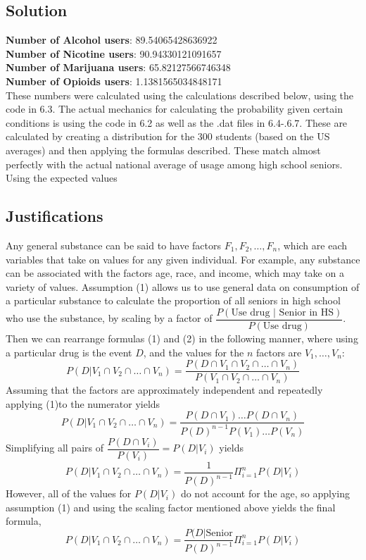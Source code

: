 \documentclass{article}
\begin{document}
    \subsection{Solution}
        \textbf{Number of Alcohol users}: 89.54065428636922\\
        \textbf{Number of Nicotine users}: 90.94330121091657\\
        \textbf{Number of Marijuana users}: 65.82127566746348\\
        \textbf{Number of Opioids users}: 1.1381565034848171\\
        These numbers were calculated using the calculations described below, using the code in 6.3. The actual mechanics for calculating the probability given certain conditions is using the code in 6.2 as well as the .dat files in 6.4-.6.7. These are calculated by creating a distribution for the 300 students (based on the US averages) and then applying the formulas described. These match almost perfectly with the actual national average of usage among high school seniors. Using the expected values 
    \subsection{Justifications}
    Any general substance can be said to have factors $F_1, F_2, \ldots, F_n$, which are each variables that take on values for any given individual. For example, any substance can be associated with the factors age, race, and income, which may take on a variety of values. Assumption (1) allows us to use general data on consumption of a particular substance to calculate the proportion of all seniors in high school who use the substance, by scaling by a factor of $\dfrac{P(\text{Use drug }|\text{ Senior in HS})}{P(\text{Use drug})}$. Then we can rearrange formulas (1) and (2) in the following manner, where using a particular drug is the event $D$, and the values for the $n$ factors are $V_1, \ldots, V_n$:
    \[
    P(D|V_1\cap V_2 \cap \ldots \cap V_n) = \dfrac{P(D\cap V_1\cap V_2 \cap \ldots \cap V_n)}{P(V_1\cap V_2 \cap \ldots \cap V_n)}
    \]
    Assuming that the factors are approximately independent and repeatedly applying (1)to the numerator yields
    \[
    P(D|V_1\cap V_2 \cap \ldots \cap V_n)=\dfrac{P(D\cap V_1)\ldots P(D\cap V_n)}{P(D)^{n-1}P(V_1)\ldots P(V_n)}
    \]
    Simplifying all pairs of $\dfrac{P(D\cap V_i)}{P(V_i)}=P(D|V_i)$ yields
    \[
    P(D|V_1\cap V_2 \cap \ldots \cap V_n)=\dfrac{1}{P(D)^{n-1}}\Pi_{i=1}^nP(D|V_i)
    \]
    However, all of the values for $P(D|V_i)$ do not account for the age, so applying assumption (1) and using the scaling factor mentioned above yields the final formula, \[
    P(D|V_1\cap V_2 \cap \ldots \cap V_n) = \dfrac{P(D|\text{Senior}}{P(D)^{n-1}}\Pi_{i=1}^nP(D|V_i)
    \]
\end{document}
